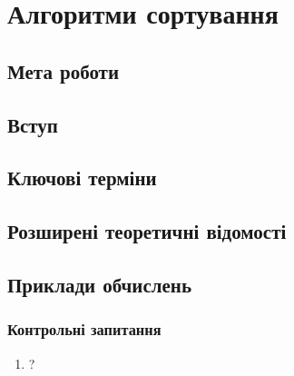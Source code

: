 \chapter{Алгоритми сортування}
\nopagebreak[4]
\section*{Мета роботи}

\nopagebreak[4]
\section{Вступ}
\nopagebreak[4]


\section{Ключові терміни}
\nopagebreak[4]




\section{Розширені теоретичні відомості}
\nopagebreak[4]




\section{Приклади обчислень}
\nopagebreak[4]




\subsection*{Контрольні запитання}
\nopagebreak[4]
\begin{enumerate}
\item ?
\end{enumerate}



